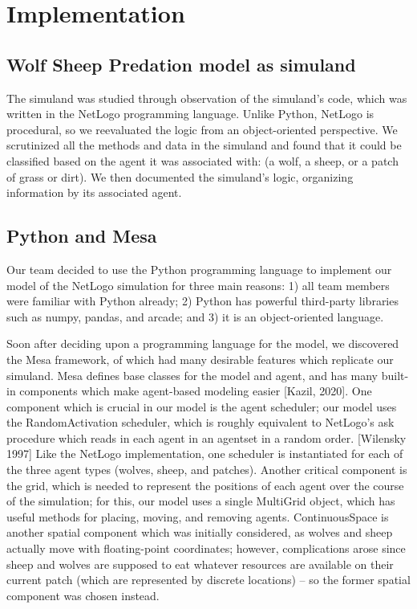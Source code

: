 
\section{Implementation}\label{sec:Implementation}

    \subsection{Wolf Sheep Predation model as simuland}\label{subsec:simuland-wsp}
        The simuland was studied through observation of the simuland's code,
        which was written in the NetLogo programming language.
        Unlike Python, NetLogo is procedural, so we reevaluated the logic from an
        object-oriented perspective.
        We scrutinized all the methods and data in the simuland and found that it
        could be classified based on the agent it was associated with:
        (a wolf, a sheep, or a patch of grass or dirt).
        We then documented the simuland's logic, organizing information by its
        associated agent.

    \subsection{Python and Mesa}\label{subsec:python-and-mesa}
        Our team decided to use the Python programming language to implement our model
        of the NetLogo simulation for three main reasons:
        1) all team members were familiar with Python already;
        2) Python has powerful third-party libraries such as numpy, pandas, and arcade;
        and 3) it is an object-oriented language.

        Soon after deciding upon a programming language for the model,
        we discovered the Mesa framework, of which had many desirable features
        which replicate our simuland.
        Mesa defines base classes for the model and agent,
        and has many built-in components which make agent-based modeling easier [Kazil, 2020].
        One component which is crucial in our model is the agent scheduler;
        our model uses the RandomActivation scheduler, which is roughly equivalent
        to NetLogo's ask procedure which reads in each agent in an
        agentset in a random order. [Wilensky 1997]
        Like the NetLogo implementation, one scheduler is instantiated for each of the
        three agent types (wolves, sheep, and patches).
        Another critical component is the grid, which is needed to represent the positions
        of each agent over the course of the simulation;
        for this, our model uses a single MultiGrid object, which has useful methods
        for placing, moving, and removing agents.
        ContinuousSpace is another spatial component which was initially considered,
        as wolves and sheep actually move with floating-point coordinates;
        however, complications arose since sheep and wolves are supposed to eat whatever
        resources are available on their current patch (which are represented by discrete
        locations) -- so the former spatial component was chosen instead.


